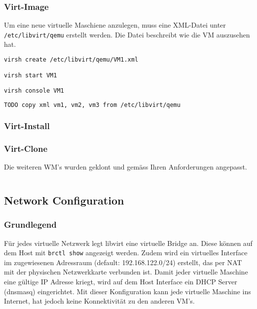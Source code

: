 \subsubsection{Virt-Image}
Um eine neue virtuelle Maschiene anzulegen, muss eine XML-Datei unter \lstinline|/etc/libvirt/qemu| erstellt werden. Die Datei beschreibt wie die VM auszusehen hat. 


\begin{lstlisting}[language=bash]
virsh create /etc/libvirt/qemu/VM1.xml

virsh start VM1 

virsh console VM1
\end{lstlisting}

\begin{lstlisting}[language=XML]
 TODO copy xml vm1, vm2, vm3 from /etc/libvirt/qemu
\end{lstlisting}

\subsubsection{Virt-Install}

\subsubsection{Virt-Clone}
Die weiteren WM's wurden geklont und gemäss Ihren Anforderungen angepasst.
\begin{lstlisting}[language=bash]

\end{lstlisting}


\subsection{Network Configuration}


\subsubsection{Grundlegend}
Für jedes virtuelle Netzwerk legt libvirt eine virtuelle Bridge an. Diese können auf dem Host mit \lstinline|brctl show| angezeigt werden. Zudem wird ein virtuelles Interface im zugewiesenen Adressraum (default: 192.168.122.0/24) erstellt, das per NAT mit der physischen Netzwerkkarte verbunden ist. Damit jeder virtuelle Maschine eine gültige IP Adresse kriegt, wird auf dem Host Interface ein DHCP Server (dnsmasq) eingerichtet. Mit dieser Konfiguration kann jede virtuelle Maschine ins Internet, hat jedoch keine Konnektivität zu den anderen VM's. 

